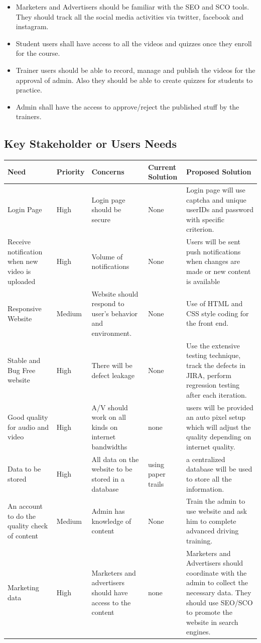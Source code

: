 \documentclass{article}
\begin{document}
\begin{itemize}
    \item Marketers and Advertisers should be familiar with the SEO and SCO tools. They should track all the social media activities via twitter, facebook and instagram.
    \item Student users shall have access to all the videos and quizzes once they enroll for the course.
    \item Trainer users should be able to record, manage and publish the videos for the approval of admin. Also they should be able to create quizzes for students to practice.
    \item Admin shall have the access to approve/reject the published stuff by the trainers.
\end{itemize}

\subsection{Key Stakeholder or Users Needs}


\begin{longtable}{|p{2.5cm}|p{2.5cm}|p{3.5cm}|p{3.5cm}|p{3.5cm}|}
\hline
\textbf{Need} & \textbf{Priority} & \textbf{Concerns} & \textbf{Current Solution} & \textbf{Proposed Solution}\\ \hline

Login Page & High & Login page should be secure & None & Login page will use captcha and unique userIDs and password with specific criterion.\\ \hline
Receive notification when new video is uploaded & High & Volume of notifications & None & Users will be sent push notifications when changes are made or new content is available\\ \hline
Responsive Website & Medium & Website should respond to user's behavior and environment. & None & Use of HTML and CSS style coding for the front end. \\ \hline
Stable and Bug Free website & High & There will be defect leakage & None & Use the extensive testing technique, track the defects in JIRA, perform regression testing after each iteration. \\ \hline
Good quality for audio and video & High & A/V should work on all kinds on internet bandwidths& none & users will be provided an auto pixel setup which will adjust the quality depending on internet quality. \\ \hline
Data to be stored & High & All data on the website to be stored in a database & using paper trails & a centralized database will be used to store all the information. \\ \hline
An account to do the quality check of content & Medium & Admin has knowledge of content & None & Train the admin to use website and ask him to complete advanced driving training.\\ \hline
Marketing data & High & Marketers and advertisers should have access to the content & none & Marketers and Advertisers should coordinate with the admin to collect the necessary data. They should use SEO/SCO to promote the website in search engines.\\ \hline

\end{longtable}
\end{document}
